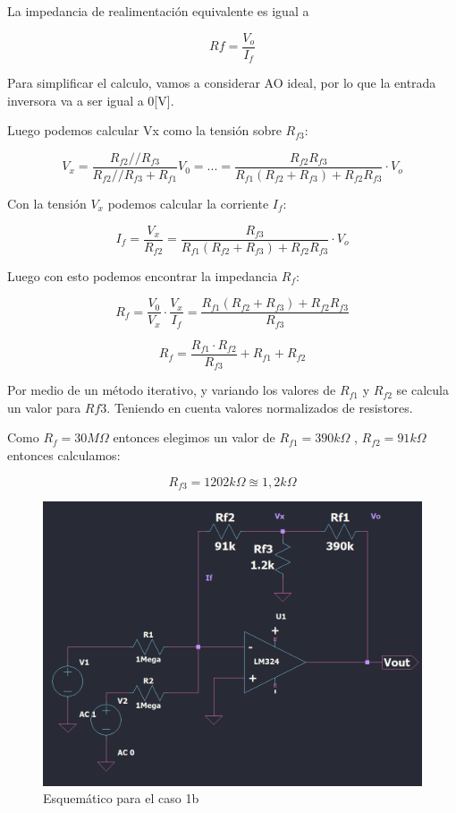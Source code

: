 La impedancia de realimentación equivalente es igual a 

\[Rf = \frac{V_o}{I_f}\]

Para simplificar el calculo, vamos a considerar AO ideal, por lo que la entrada inversora va a ser igual a 0[V].

Luego podemos calcular Vx como la tensión sobre $R_{f3}$:

\[ V_x = \frac{  R_{f2} //  R_{f3} }{ R_{f2} //  R_{f3} + R_{f1} } V_0  = ... = \frac{R_{f2} R_{f3}}{R_{f1} (R_{f2} + R_{f3}) + R_{f2} R_{f3}} \cdot V_o
\]

Con la tensión $V_x$ podemos calcular la corriente $I_f$:

\[ I_f = \frac{V_x}{R_{f2}} = \frac{R_{f3}}{R_{f1} (R_{f2} + R_{f3}) + R_{f2} R_{f3}} \cdot V_o\]


Luego con esto podemos encontrar la impedancia $R_f$:

\[R_f = \frac{V_0}{V_x} \cdot \frac{V_x}{I_f} = \frac{R_{f1} (R_{f2} + R_{f3}) + R_{f2} R_{f3}}{R_{f3}} \]

\[R_f = \frac{R_{f1} \cdot R_{f2} }{R_{f3} } +R_{f1}  + R_{f2}  \]

Por medio de un método iterativo, y variando los valores de $R_{f1}$ y $R_{f2}$ se calcula un valor para $R{f3}$. Teniendo en cuenta valores normalizados de resistores.

\vspace{1em}

Como $R_f = 30M\Omega$ entonces elegimos un valor de $R_{f1} = 390k \Omega$ , $R_{f2} = 91k \Omega$ entonces calculamos:

\vspace{1em}
\[R_{f3} = 1202k\Omega \approxeq 1,2k \Omega \]


\begin{figure}[h!]
    \centering
    \includegraphics[width=0.90\linewidth]{img/caso1b.png}
    \caption{Esquemático para el caso 1b}
    \label{fig:caso1a}
\end{figure}


